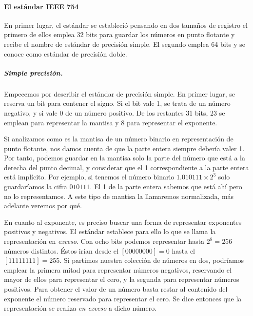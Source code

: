 \paragraph*{El estándar IEEE 754}
En primer lugar, el estándar se estableció pensando en dos tamaños de registro el primero de ellos emplea 32 bits para guardar los números en punto flotante y recibe el nombre de estándar de precisión simple. El segundo emplea 64 bits y se conoce como estándar de precisión doble.

\subparagraph*{Simple precisión.} Empecemos por describir el estándar de precisión simple. En primer lugar, se reserva un bit para contener el signo. Si el bit vale 1, se trata de un número negativo, y si vale 0 de un número positivo. De los restantes 31 bits, 23 se emplean para representar la mantisa y 8 para representar el exponente.

Si analizamos como es la mantisa de un número binario en representación de punto flotante, nos damos cuenta de que la parte entera siempre debería valer 1. Por tanto, podemos guardar en la mantisa solo la parte del número que está a la derecha del punto decimal, y considerar que el  1 correspondiente a la parte entera está implícito. Por ejemplo, si tenemos el número binario $1.010111\times 2^{3}$ solo guardaríamos la cifra $010111$. El 1 de la parte entera sabemos que está ahí pero no lo representamos. A este tipo de mantisa la llamaremos normalizada, más adelante veremos por qué.

 En cuanto al exponente, es preciso buscar una forma de representar exponentes positivos y negativos. El estándar establece para ello lo que se llama la representación en \emph{exceso}. Con ocho bits podemos representar hasta $2^8=256$ números distintos. Éstos irían desde el $[00000000]=0$ hasta el $[11111111]=255$. Si partimos nuestra colección de números en dos, podríamos emplear la primera mitad para representar números negativos, reservando el mayor de ellos para representar el cero, y la segunda para representar números positivos. Para obtener el valor de un número basta restar al contenido del exponente el número reservado para representar el cero. Se dice entonces que la representación se realiza \emph{en exceso} a dicho número.

